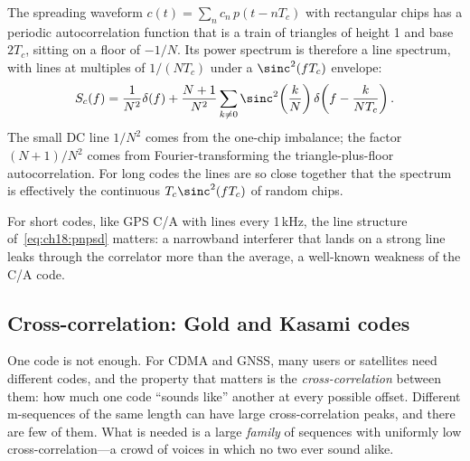 
\begin{deeper}
The spreading waveform $c(t)=\sum_nc_n\,p(t-nT_c)$ with rectangular
chips has a periodic autocorrelation function that is a train of triangles of height 1
and base $2T_c$, sitting on a floor of $-1/N$. Its power spectrum is therefore a line spectrum,
with lines at multiples of $1/(NT_c)$ under a $\sinc^2(fT_c)$ envelope:
\begin{equation}
S_c(f)=\frac{1}{N^2}\delta(f)+\frac{N+1}{N^2}\sum_{k\ne0}\sinc^2\!\left(\frac{k}{N}\right)\delta\!\left(f-\frac{k}{NT_c}\right).
\label{eq:ch18:pnpsd}
\end{equation}
The small DC line $1/N^2$ comes from the one-chip imbalance; the factor $(N+1)/N^2$ comes from
Fourier-transforming the triangle-plus-floor autocorrelation. For long codes the lines are so close
together that the spectrum is effectively the continuous $T_c\sinc^2(fT_c)$ of random chips.
\end{deeper}

For short codes, like GPS C/A with lines every 1\,kHz, the line structure of~\eqref{eq:ch18:pnpsd}
matters: a narrowband interferer that lands on a strong line leaks through the correlator more
than the average, a well-known weakness of the C/A code.

\subsection{Cross-correlation: Gold and Kasami codes}

One code is not enough. For CDMA and GNSS, many users or satellites need different codes, and the
property that matters is the \emph{cross-correlation} between them: how much one code ``sounds
like'' another at every possible offset. Different m-sequences of the same length can have large
cross-correlation peaks, and there are few of them. What is needed is a large \emph{family} of
sequences with uniformly low cross-correlation---a crowd of voices in which no two ever sound
alike.

